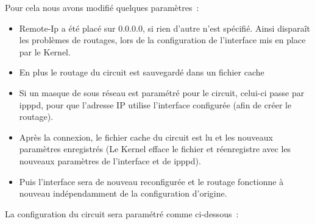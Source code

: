 Pour cela nous avons modifié quelques paramètres~:
\begin{itemize}

\item Remote-Ip a été placé sur 0.0.0.0,  si rien d'autre n'est spécifié. 
  Ainsi disparaît les problèmes de routages, lors de la configuration de 
  l'interface mis en place par le Kernel.

\item En plus le routage du circuit est sauvegardé dans un fichier cache

\item Si un masque de sous réseau est paramétré pour le circuit, celui-ci 
  passe par ipppd, pour que l'adresse IP utilise l'interface configurée 
  (afin de créer le routage).

\item Après la connexion, le fichier cache du circuit est lu et les nouveaux 
  paramètres enregistrés (Le Kernel efface le fichier et réenregistre avec 
  les nouveaux paramètres de l'interface et de ipppd).

\item Puis l'interface sera de nouveau reconfigurée et le routage fonctionne 
  à nouveau indépendamment de la configuration d'origine.
\end{itemize}

La configuration du circuit sera paramétré comme ci-dessous~:

